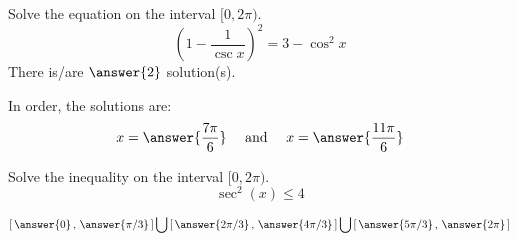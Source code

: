 \documentclass{ximera}
\author{Bobby Ramsey}
\begin{document}
\begin{exercise}
	Solve the equation on the interval $[0, 2\pi)$.
	\[ \left( 1 - \frac{1}{\csc x } \right)^2  = 3 - \cos^2 x\]
	There is/are $\answer{2}$ solution(s).
	\begin{exercise}
		In order, the solutions are:
		\[ x = \answer{\frac{7\pi}{6} } \quad \text{ and } \quad x = \answer{\frac{11\pi}{6}} \]
	\end{exercise}
\end{exercise}

\begin{exercise}
	Solve the inequality on the interval $[0,2\pi)$.
	\[ \sec^2(x) \leq 4 \]
	
	\[ \left[ \,\answer{0} \, , \, \answer{\pi/3} \, \right] \bigcup \left[ \,\answer{2\pi/3} \, , \, \answer{4\pi/3} \, \right] \bigcup \left[ \,\answer{5\pi/3} \, , \, \answer{2\pi} \, \right] \]
	
\end{exercise}
\end{document}
